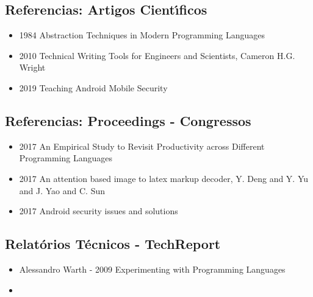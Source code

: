 \subsection{Referencias:  Artigos Cient\'{\i}ficos}
\begin{itemize}
  \item 1984 Abstraction Techniques in Modern Programming Languages \cite{Shaw1984}
  \item 2010 Technical Writing Tools for Engineers and Scientists,  Cameron H.G. Wright \cite{Wright2010}
  \item 2019 Teaching Android Mobile Security \cite{Lalande2019}
\end{itemize}



\subsection{Referencias:  Proceedings - Congressos}
\begin{itemize}
  \item 2017 An Empirical Study to Revisit Productivity across Different Programming Languages
  \item 2017 An attention based image to latex markup decoder, Y. Deng and Y. Yu and J. Yao and C. Sun \cite{Deng2017}
  \item 2017 Android security issues and solutions \cite{Karthick2017}
\end{itemize}

\subsection{Relat\'{o}rios T\'{e}cnicos - TechReport}
\begin{itemize}
  \item Alessandro Warth - 2009 Experimenting with Programming Languages
  \item
\end{itemize}
